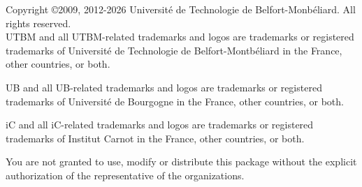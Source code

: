 \documentclass[article]{upmethodology-document}
\begin{document}
Copyright \copyright 2009, 2012-2026 Universit\'e de Technologie de Belfort-Monb\'eliard. All rights reserved. \\

UTBM and all UTBM-related trademarks and logos are trademarks or registered trademarks of Universit\'e de Technologie de Belfort-Montb\'eliard in the France, other countries, or both.

UB and all UB-related trademarks and logos are trademarks or registered trademarks of Universit\'e de Bourgogne in the France, other countries, or both.

iC and all iC-related trademarks and logos are trademarks or registered trademarks of Institut Carnot in the France, other countries, or both.

You are not granted to use, modify or distribute this package without the explicit authorization of the representative of the organizations.
\end{document}

